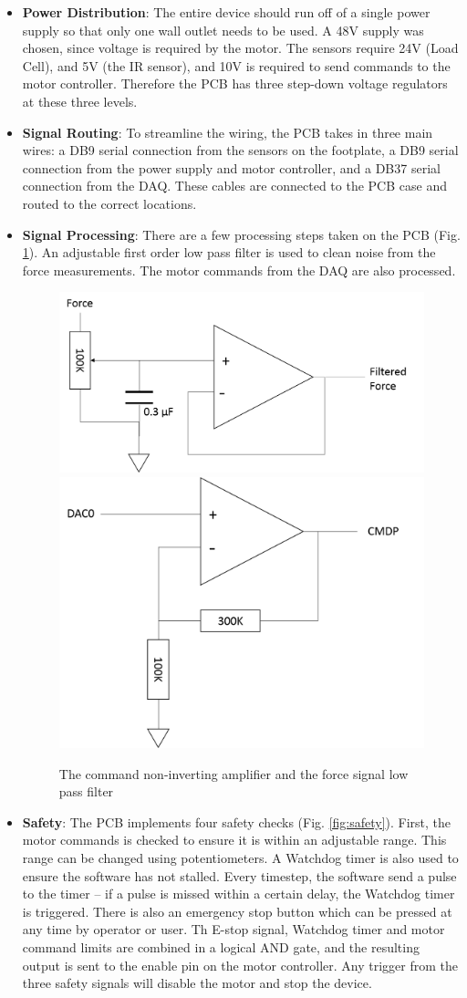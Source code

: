 \documentclass[12pt]{report}
\begin{document}
	\begin{itemize}
	\item \textbf{Power Distribution}: The entire device should run off of a single power supply so that only one wall outlet needs to be used. A 48V supply was chosen, since voltage is required by the motor. The sensors require 24V (Load Cell), and 5V (the IR sensor), and 10V is required to send commands to the motor controller. Therefore the PCB has three step-down voltage regulators at these three levels.
	\item \textbf{Signal Routing}: To streamline the wiring, the PCB takes in three main wires: a DB9 serial connection from the sensors on the footplate, a DB9 serial connection from  the power supply and motor controller, and a DB37 serial connection from the DAQ. These cables are connected to the PCB case and routed to the correct locations.
	\item \textbf{Signal Processing}: There are a few processing steps taken on the PCB (Fig. \ref{fig:amp}). An adjustable first order low pass filter is used to clean noise from the force measurements. The motor commands from the DAQ are also processed. 

	\begin{figure}[h] 
		\centering
		\includegraphics[width=0.4\linewidth]{ft_filter}
		\includegraphics[width=0.4\linewidth]{amplifier}
		\caption{The command non-inverting amplifier and the force signal low pass filter}
		\label{fig:amp}
	\end{figure}	
	
	\item \textbf{Safety}: The PCB implements four safety checks (Fig. \ref{fig:safety}). First, the motor commands is checked to ensure it is within an adjustable range. This range can be changed using potentiometers. A Watchdog timer is also used to ensure the software has not stalled. Every timestep, the software send a pulse to the timer -- if a pulse is missed within a certain delay, the Watchdog timer is triggered. There is also an emergency stop button which can be pressed at any time by operator or user. Th E-stop signal, Watchdog timer and motor command limits are combined in a logical AND gate, and the resulting output is sent to the enable pin on the motor controller. Any trigger from the three safety signals will disable the motor and stop the device.


\end{itemize}
\end{document}

